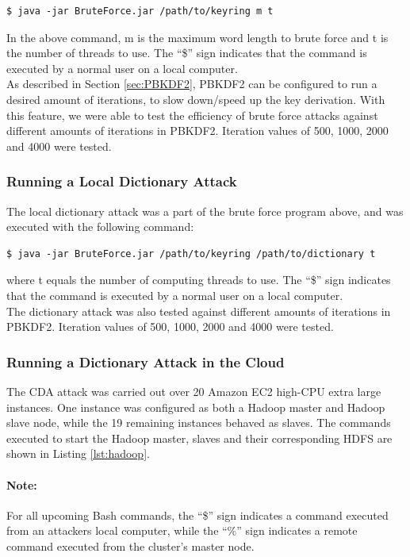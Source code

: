 \documentclass[pdftex,english,10pt,b5paper,twoside]{book}
\begin{document}
\lstset{label=lst:bf, caption=Running local brute force attack}
\begin{lstlisting}
$ java -jar BruteForce.jar /path/to/keyring m t
\end{lstlisting}

\noindent In the above command, m is the maximum word length to brute force and t
is the number of threads to use. The ``\$'' sign indicates that the command is
executed by a normal user on a local computer.\\

\noindent As described in Section \ref{sec:PBKDF2}, PBKDF2 can be configured to run a desired
amount of iterations, to slow down/speed up the key derivation. With this
feature, we were able to test the efficiency of brute force attacks against
different amounts of iterations in PBKDF2. Iteration values of 500, 1000, 2000
and 4000 were tested.

\subsubsection{Running a Local Dictionary Attack}
The local dictionary attack was a part of the brute force program above, and was
executed with the following command:

\lstset{label=lst:da, caption=Running local dictionary attack}
\begin{lstlisting}
$ java -jar BruteForce.jar /path/to/keyring /path/to/dictionary t
\end{lstlisting}
\noindent where t equals the number of computing threads to use. The ``\$'' sign
indicates that the command is executed by a normal user on a local computer.\\

\noindent The dictionary attack was also tested against different amounts of iterations in
PBKDF2. Iteration values of 500, 1000, 2000 and 4000 were tested.

\subsubsection{Running a Dictionary Attack in the Cloud}
The CDA attack was carried out over 20 Amazon EC2 high-CPU extra large
instances. One instance was configured as both a Hadoop master and Hadoop slave node, while the
19 remaining instances behaved as slaves. The commands executed
to start the Hadoop master, slaves and their corresponding \ac{HDFS} are shown
in Listing \ref{lst:hadoop}.

\paragraph{Note:}For all upcoming Bash commands, the ``\$'' sign indicates a command
executed from an attackers local computer, while the ``\%'' sign indicates a
remote command executed from the cluster's master node.
\end{document}
